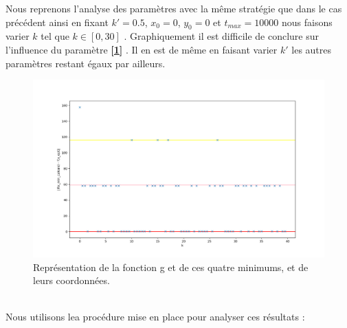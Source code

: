 \documentclass[12pt]{article}
\begin{document}
\begin{minipage}{0.5\textwidth}
Nous reprenons l'analyse des paramètres avec la même stratégie que dans le cas précédent ainsi en fixant $k'=0.5$, $x_0=0$, $y_0=0$ et $t_{max}=10000$ nous faisons varier $k$ tel que $k\in [0,30]$ . Graphiquement il est difficile de conclure sur l'influence du paramètre \textbf{[\ref{Q2K}]}
. Il en est de même en faisant varier $k'$ les autres paramètres restant égaux par ailleurs.
\end{minipage} \hfill
\begin{minipage}{0.45\textwidth}
\begin{figure}[H]
\includegraphics[width=1\textwidth]{Q2K.png}
\caption{Représentation de la fonction g et de ces quatre minimums, et de leurs coordonnées.}
\label{Q2K}
\end{figure}
\end{minipage}
\\
Nous utilisons lea procédure mise en place pour analyser ces résultats :
\end{document}
